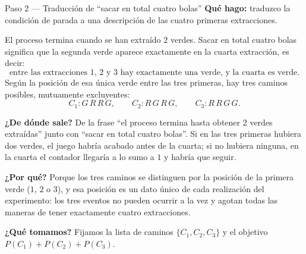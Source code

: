 \documentclass[11pt]{article}
\begin{document}
\begin{paso}{Paso 2 --- Traducción de ``sacar en total cuatro bolas''}
\textbf{Qué hago:} traduzco la condición de parada a una descripción de las cuatro primeras extracciones.

El proceso termina cuando se han extraído $2$ verdes. Sacar en total cuatro bolas significa que la segunda verde aparece exactamente en la cuarta extracción, es decir:
\[
\text{entre las extracciones 1, 2 y 3 hay exactamente una verde, y la cuarta es verde.}
\]
Según la posición de esa única verde entre las tres primeras, hay tres caminos posibles, mutuamente excluyentes:
\[
C_1: G\,R\,R\,G,
\qquad
C_2: R\,G\,R\,G,
\qquad
C_3: R\,R\,G\,G .
\]

\textbf{¿De dónde sale?} De la frase ``el proceso termina hasta obtener 2 verdes extraídas'' junto con ``sacar en total cuatro bolas''. Si en las tres primeras hubiera dos verdes, el juego habría acabado antes de la cuarta; si no hubiera ninguna, en la cuarta el contador llegaría a lo sumo a $1$ y habría que seguir.

\textbf{¿Por qué?} Porque los tres caminos se distinguen por la posición de la primera verde ($1$, $2$ o $3$), y esa posición es un dato único de cada realización del experimento: los tres eventos no pueden ocurrir a la vez y agotan todas las maneras de tener exactamente cuatro extracciones.

\textbf{¿Qué tomamos?} Fijamos la lista de caminos $\{C_1,C_2,C_3\}$ y el objetivo $P(C_1)+P(C_2)+P(C_3)$.
\end{paso}
\end{document}
